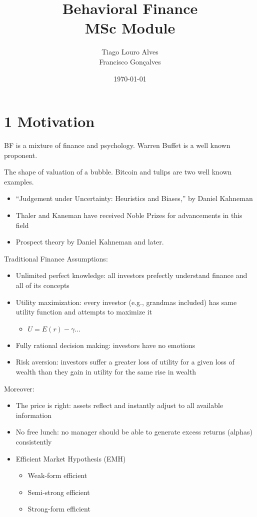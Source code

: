 \documentclass[0pt, a4paper]{article}
\title{%
  Behavioral Finance\\
  \large MSc Module}
\date{\today}
\author{
	Tiago Louro Alves \\
	Francisco Gon\c{c}alves
}
\begin{document}
\maketitle
{}
\thispagestyle{empty}
\newpage

\tableofcontents

\clearpage
{}
\section*{1 Motivation}


BF is a mixture of finance and psychology. Warren Buffet is a well known proponent.

The shape of valuation of a bubble. Bitcoin and tulips are two well known examples.

\begin{itemize}
	\item ``Judgement under Uncertainty: Heuristics and Biases,'' by Daniel Kahneman
	\item Thaler and Kaneman have received Noble Prizes for advancements in this field
	\item Prospect theory by Daniel Kahneman and later.
\end{itemize}

Traditional Finance Assumptions:

\begin{itemize}
	\item Unlimited perfect knowledge: all investors prefectly understand finance and all of its concepts
	\item Utility maximization: every investor (e.g., grandmas included) has same utility function and attempts to maximize it
	\begin{itemize}
		\item $U=E(r)-\gamma \dots$
	\end{itemize}
	\item Fully rational decision making: investors have no emotions
	\item Risk aversion: investors suffer a greater loss of utility for a given loss of wealth than they gain in utility for the same rise in wealth
\end{itemize}

Moreover:
\begin{itemize}
	\item The price is right: assets reflect and instantly adjust to all available information
	\item No free lunch: no manager should be able to generate excess returns (alphas) consistently
	\item Efficient Market Hypothesis (EMH)
	\begin{itemize}
		\item Weak-form efficient
		\item Semi-strong efficient
		\item Strong-form efficient
	\end{itemize}
\end{itemize}
\end{document}

